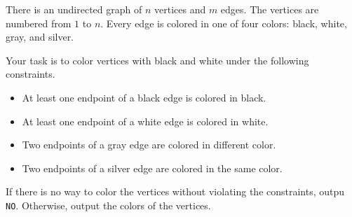 There is an undirected graph of $n$ vertices and $m$ edges.
The vertices are numbered from $1$ to $n$.
Every edge is colored in one of four colors: black, white, gray, and silver.

Your task is to color vertices with black and white under the 
following constraints.
\begin{itemize}
\item At least one endpoint of a black edge is colored in black.
\item At least one endpoint of a white edge is colored in white.
\item Two endpoints of a gray edge are colored in different color.
\item Two endpoints of a silver edge are colored in the same color.
\end{itemize}

If there is no way to color the vertices without violating the constraints,
outpu \verb+NO+. Otherwise, output the colors of the vertices.
